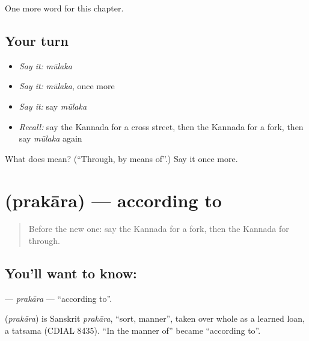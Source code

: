 \begin{grammarlens}[title={What you've built}]
One more word for this chapter.
\end{grammarlens}

\subsection*{Your turn}
\begin{itemize}
\raggedright
  \item \emph{Say it:} \emph{mūlaka}
  \item \emph{Say it:} \emph{mūlaka}, once more
  \item \emph{Say it:} say \emph{mūlaka}
  \item \emph{Recall:} say the Kannada for a cross street, then the Kannada for a fork, then say \emph{mūlaka} again
\end{itemize}

\begin{tcolorbox}[breakable,colback=teal!4,colframe=teal!35!black,title={Before you move on}]
What does  mean? (\textquotedblleft{}Through, by means of\textquotedblright{}.) Say it once more.
\end{tcolorbox}
\section[\texorpdfstring{\kn{ಪ್ರಕಾರ} (prakāra)}{ಪ್ರಕಾರ (prakāra)}]{ (prakāra) — according to}

\label{lesson:KA-C215-prakara}



\begin{quote}
Before the new one: say the Kannada for a fork, then the Kannada for through.
\end{quote}

\subsection*{You'll want to know: }
\textbf{} — \emph{prakāra} — \textquotedblleft{}according to\textquotedblright{}.

\begin{cousinweb}
\textbf{} (\emph{prakāra}) is Sanskrit \emph{prakāra}, \textquotedblleft{}sort, manner\textquotedblright{}, taken over whole as a learned loan, a tatsama (CDIAL 8435). \textquotedblleft{}In the manner of\textquotedblright{} became \textquotedblleft{}according to\textquotedblright{}.
\end{cousinweb}

